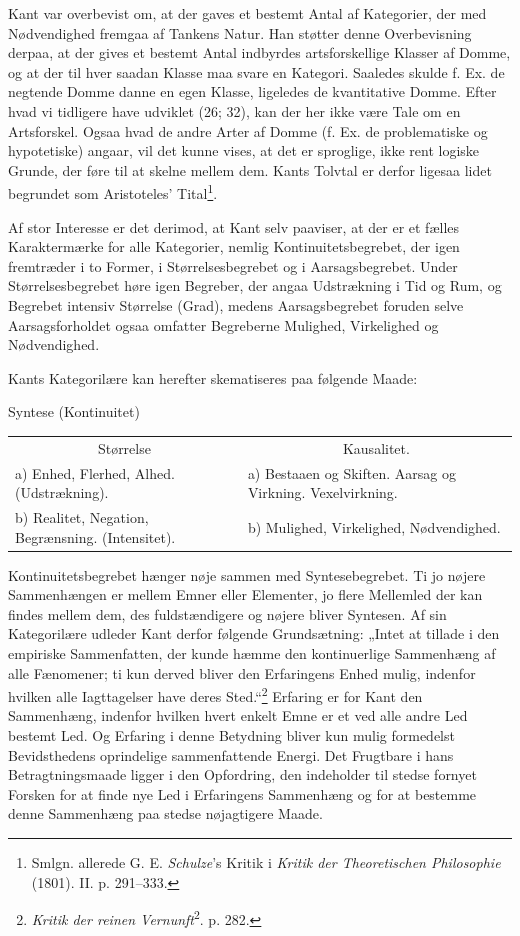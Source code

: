 \documentclass[12pt,a4paper]{book}
\newcommand{\apage}[1]{\marginnote{\footnotesize\textit{[#1]}}}
\begin{document}
Kant var overbevist om, at der gaves et bestemt Antal af Kategorier, der med
Nødvendighed fremgaa af Tankens Natur. Han støtter denne Overbevisning
derpaa, at der gives et bestemt Antal indbyrdes artsforskellige Klasser
af Domme, og at der til hver saadan Klasse maa svare en Kategori.
Saaledes skulde f. Ex. de negtende Domme danne en egen Klasse, ligeledes
de kvantitative Domme. Efter hvad vi tidligere have udviklet (26; 32),
kan der her ikke være Tale om en Artsforskel. Ogsaa hvad de andre Arter
af Domme (f. Ex. de problematiske og hypotetiske) angaar, vil det kunne
vises, at det er sproglige, ikke rent logiske Grunde, der føre til at
skelne mellem dem. Kants Tolvtal er derfor ligesaa lidet begrundet som
Aristoteles' Tital\footnote{Smlgn. allerede G. E. \emph{Schulze}'s Kritik
i \emph{Kritik der Theoretischen Philosophie} (1801). II. p. 291--333.}.

\apage{145} Af stor Interesse er det derimod, at Kant selv paaviser, at der er et
fælles Karaktermærke for alle Kategorier, nemlig Kontinuitetsbegrebet,
der igen fremtræder i to Former, i Størrelsesbegrebet og i
Aarsagsbegrebet. Under Størrelsesbegrebet høre igen Begreber, der angaa
Udstrækning i Tid og Rum, og Begrebet intensiv Størrelse (Grad), medens
Aarsagsbegrebet foruden selve Aarsagsforholdet ogsaa omfatter Begreberne
Mulighed, Virkelighed og Nødvendighed.

Kants Kategorilære kan herefter skematiseres paa følgende Maade:

\begin{center}
Syntese (Kontinuitet)

\medskip
\begin{tabular}{p{} p{}}
\multicolumn{1}{c}{Størrelse} & \multicolumn{1}{c}{Kausalitet.}\\[2pt]
a) Enhed, Flerhed, Alhed. (Udstrækning). & a) Bestaaen og Skiften. Aarsag
og Virkning. Vexelvirkning.\\
b) Realitet, Negation, Begrænsning. (Intensitet). & b) Mulighed,
Virkelighed, Nødvendighed.\\
\end{tabular}
\end{center}

Kontinuitetsbegrebet hænger nøje sammen med Syntesebegrebet. Ti jo nøjere
Sammenhængen er mellem Emner eller Elementer, jo flere Mellemled der kan
findes mellem dem, des fuldstændigere og nøjere bliver Syntesen. Af sin
Kategorilære udleder Kant derfor følgende Grundsætning: „Intet at tillade
i den empiriske Sammenfatten, der kunde hæmme den kontinuerlige
Sammenhæng af alle Fænomener; ti kun derved bliver den Erfaringens Enhed
mulig, indenfor hvilken alle Iagttagelser have deres
Sted.“\footnote{\emph{Kritik der reinen Vernunft}\textsuperscript{2}. p.
282.} Erfaring er for Kant den Sammenhæng, indenfor hvilken hvert enkelt
Emne er et ved alle andre Led bestemt Led. Og Erfaring i denne Betydning
bliver kun mulig formedelst Bevidsthedens oprindelige sammenfattende
Energi. Det Frugtbare i hans Betragtningsmaade ligger i den Opfordring,
den indeholder til stedse fornyet Forsken for at finde nye Led i
Erfaringens Sammenhæng og for at bestemme denne Sammenhæng paa stedse
nøjagtigere Maade.
\end{document}
